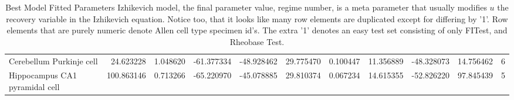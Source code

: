 \begin{table}
{\begin{tabular}{lrrrrrrrrrr}
Cerebellum Purkinje cell           &   24.623228 &  1.048620 & -61.377334 & -48.928462 &  29.775470 &  0.100447 &  11.356889 & -48.328073 &   14.756462 &         6 \\
Hippocampus CA1 pyramidal cell     &  100.863146 &  0.713266 & -65.220970 & -45.078885 &  29.810374 &  0.067234 &  14.615355 & -52.826220 &   97.845439 &         5 \\
\bottomrule
\end{tabular}}
\caption[Best Model Fitted Parameters Izhikevich model]{Best Model Fitted Parameters Izhikevich model, the final parameter value, regime number, is a meta parameter that usually modifies $u$ the recovery variable in the Izhikevich equation. Notice too, that it looks like many row elements are duplicated except for differing by '1'. Row elements that are purely numeric denote Allen cell type specimen id's. The extra '1' denotes an easy test set consisting of only FITest, and Rheobase Test.}
\end{table}
\clearpage

